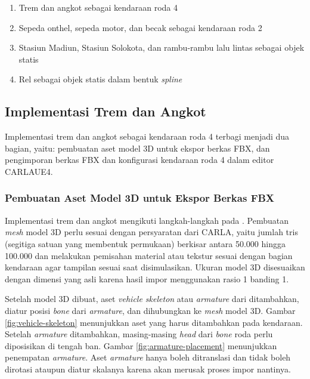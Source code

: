 \begin{enumerate}
    \item Trem dan angkot sebagai kendaraan roda 4
    \item Sepeda onthel, sepeda motor, dan becak sebagai kendaraan roda 2
    \item Stasiun Madiun, Stasiun Solokota, dan rambu-rambu lalu lintas sebagai
    objek statis
    \item Rel sebagai objek statis dalam bentuk \textit{spline}
\end{enumerate}


\subsection{Implementasi Trem dan Angkot}

Implementasi trem dan angkot sebagai kendaraan roda 4 terbagi menjadi dua
bagian, yaitu: pembuatan aset model 3D untuk ekspor berkas FBX, dan
pengimporan berkas FBX dan konfigurasi kendaraan roda 4 dalam editor CARLAUE4.

\subsubsection{Pembuatan Aset Model 3D untuk Ekspor Berkas FBX}

Implementasi trem dan angkot mengikuti langkah-langkah pada
\textcite{carla-documentation}. Pembuatan \textit{mesh} model 3D perlu sesuai
dengan persyaratan dari CARLA, yaitu jumlah tris (segitiga satuan yang membentuk
permukaan) berkisar antara 50.000 hingga 100.000 dan melakukan pemisahan
material atau tekstur sesuai dengan bagian kendaraan agar tampilan sesuai saat
disimulasikan. Ukuran model 3D disesuaikan dengan dimensi yang asli karena hasil
impor menggunakan rasio 1 banding 1.

Setelah model 3D dibuat, aset \textit{vehicle skeleton} atau \textit{armature}
dari \textcite{carla-documentation} ditambahkan, diatur posisi \textit{bone}
dari \textit{armature}, dan dihubungkan ke \textit{mesh} model 3D. Gambar
\ref{fig:vehicle-skeleton} menunjukkan aset yang harus ditambahkan pada
kendaraan. Setelah \textit{armature} ditambahkan, masing-masing \textit{head}
dari \textit{bone} roda perlu diposisikan di tengah ban. Gambar
\ref{fig:armature-placement} menunjukkan penempatan \textit{armature}. Aset
\textit{armature} hanya boleh ditranslasi dan tidak boleh dirotasi ataupun
diatur skalanya karena akan merusak proses impor nantinya.

